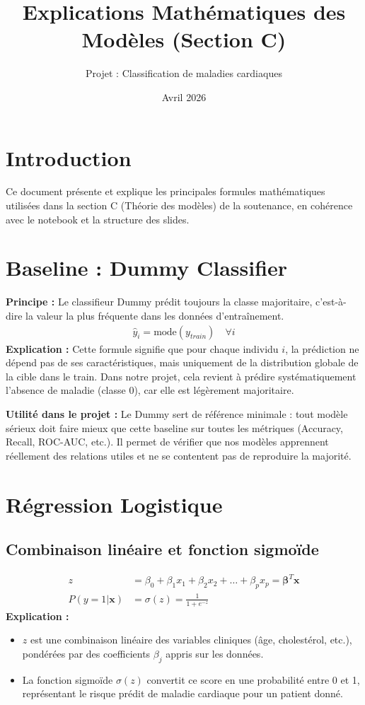 \documentclass[a4paper,12pt]{article}
\title{Explications Mathématiques des Modèles (Section C)}
\author{Projet : Classification de maladies cardiaques}
\date{Avril 2026}
\begin{document}
\maketitle

\section*{Introduction}
Ce document présente et explique les principales formules mathématiques utilisées dans la section C (Théorie des modèles) de la soutenance, en cohérence avec le notebook et la structure des slides.

\section{Baseline : Dummy Classifier}

\textbf{Principe :} Le classifieur Dummy prédit toujours la classe majoritaire, c'est-à-dire la valeur la plus fréquente dans les données d'entraînement.
\begin{align*}
\hat{y}_i = \text{mode}(y_{train}) \quad \forall i
\end{align*}
\textbf{Explication :} Cette formule signifie que pour chaque individu $i$, la prédiction ne dépend pas de ses caractéristiques, mais uniquement de la distribution globale de la cible dans le train. Dans notre projet, cela revient à prédire systématiquement l'absence de maladie (classe 0), car elle est légèrement majoritaire.

\textbf{Utilité dans le projet :} Le Dummy sert de référence minimale : tout modèle sérieux doit faire mieux que cette baseline sur toutes les métriques (Accuracy, Recall, ROC-AUC, etc.). Il permet de vérifier que nos modèles apprennent réellement des relations utiles et ne se contentent pas de reproduire la majorité.

\section{Régression Logistique}

\subsection*{Combinaison linéaire et fonction sigmoïde}
\begin{align*}
z &= \beta_0 + \beta_1 x_1 + \beta_2 x_2 + \dots + \beta_p x_p = \boldsymbol{\beta}^T \mathbf{x} \\
P(y=1|\mathbf{x}) &= \sigma(z) = \frac{1}{1 + e^{-z}}
\end{align*}
\textbf{Explication :}
\begin{itemize}
  \item $z$ est une combinaison linéaire des variables cliniques (âge, cholestérol, etc.), pondérées par des coefficients $\beta_j$ appris sur les données.
  \item La fonction sigmoïde $\sigma(z)$ convertit ce score en une probabilité entre 0 et 1, représentant le risque prédit de maladie cardiaque pour un patient donné.
\end{itemize}
\end{document}
